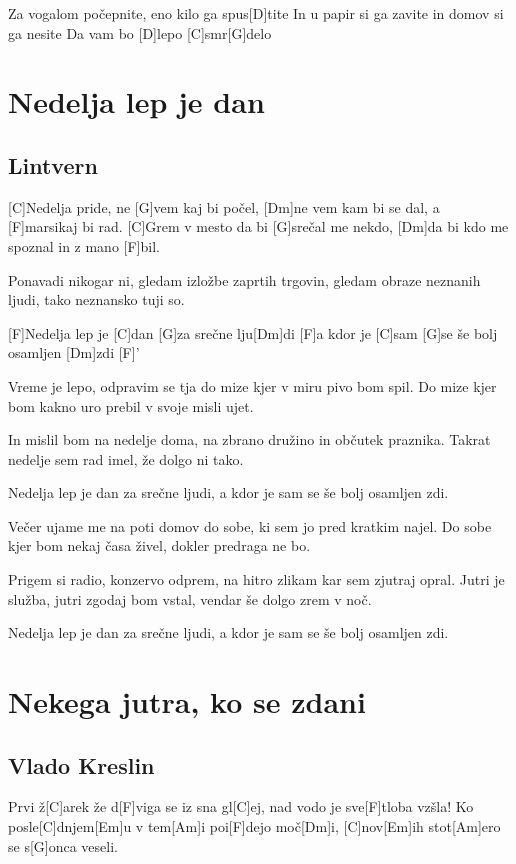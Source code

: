 \documentclass[a4paper,12pt]{article}
\begin{document}
\begin{multicols}{2}
\begin{guitar}
[G]Za vogalom počepnite, eno kilo ga spus[D]tite
In u papir si ga zavite in domov si ga nesite
Da vam bo [D]lepo [C]smr[G]delo

\end{guitar}
\section{Nedelja lep je dan}
\subsection*{Lintvern}
\begin{guitar}
[C G Dm F]

[C]Nedelja pride, ne [G]vem kaj bi počel,
[Dm]ne vem kam bi se dal, a [F]marsikaj bi rad.
[C]Grem v mesto da bi [G]srečal me nekdo,
[Dm]da bi kdo me spoznal in z mano [F]bil.


Ponavadi nikogar ni,
gledam izložbe zaprtih trgovin,
gledam obraze neznanih ljudi,
tako neznansko tuji so.

  
[F]Nedelja lep je [C]dan
[G]za srečne lju[Dm]di      
[F]a kdor je [C]sam       
[G]se še bolj osamljen [Dm]zdi [F]'   


Vreme je lepo, odpravim se tja
do mize kjer v miru pivo bom spil.
Do mize kjer bom kakno uro prebil
v svoje misli ujet.


In mislil bom na nedelje doma,
na zbrano družino in občutek praznika.
Takrat nedelje sem rad imel,
že dolgo ni tako.


Nedelja lep je dan         
za srečne ljudi,           
a kdor je sam              
se še bolj osamljen zdi.   


Večer ujame me na poti domov
do sobe, ki sem jo pred kratkim najel.
Do sobe kjer bom nekaj časa živel,
dokler predraga ne bo.


Prigem si radio, konzervo odprem,
na hitro zlikam kar sem zjutraj opral.
Jutri je služba, jutri zgodaj bom vstal,
vendar še dolgo zrem v noč.


Nedelja lep je dan         
za srečne ljudi,           
a kdor je sam              
se še bolj osamljen zdi.   

\end{guitar}
\section{Nekega jutra, ko se zdani}
\subsection*{Vlado Kreslin}
\begin{guitar}
Prvi ž[C]arek že d[F]viga se iz sna
gl[C]ej, nad vodo je sve[F]tloba vzšla!
Ko posle[C]dnjem[Em]u v tem[Am]i poi[F]dejo moč[Dm]i,
[C]nov[Em]ih stot[Am]ero se s[G]onca veseli.



\end{guitar}
\end{multicols}
\end{document}
